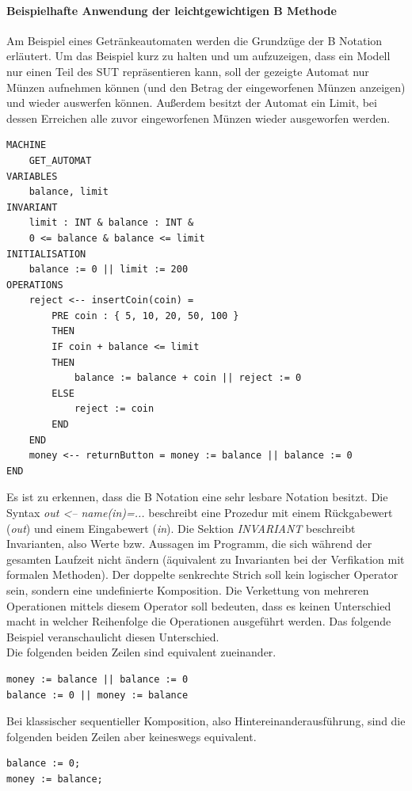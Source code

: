 \paragraph{Beispielhafte Anwendung der leichtgewichtigen B Methode}
Am Beispiel eines Getränkeautomaten werden die Grundzüge der B Notation erläutert. Um das Beispiel kurz zu halten und um aufzuzeigen, dass ein Modell nur einen Teil des \Gls{SUT} repräsentieren kann, soll der gezeigte Automat nur Münzen aufnehmen können (und den Betrag der eingeworfenen Münzen anzeigen) und wieder auswerfen können. Außerdem besitzt der Automat ein Limit, bei dessen Erreichen alle zuvor eingeworfenen Münzen wieder ausgeworfen werden.

\begin{lstlisting}[caption={Modell eines Getränkeautomaten in B-Notation},label=lst:b-notation]
MACHINE
	GET_AUTOMAT
VARIABLES
	balance, limit
INVARIANT
	limit : INT & balance : INT &
	0 <= balance & balance <= limit
INITIALISATION
	balance := 0 || limit := 200
OPERATIONS
	reject <-- insertCoin(coin) =
		PRE coin : { 5, 10, 20, 50, 100 }
		THEN
		IF coin + balance <= limit
		THEN
			balance := balance + coin || reject := 0
		ELSE
			reject := coin
		END
	END
	money <-- returnButton = money := balance || balance := 0
END
\end{lstlisting}

Es ist zu erkennen, dass die B Notation eine sehr lesbare Notation besitzt. Die Syntax \textit{out <-- name(in)=...} beschreibt eine Prozedur mit einem Rückgabewert (\textit{out}) und einem Eingabewert (\textit{in}). Die Sektion \textit{INVARIANT} beschreibt Invarianten, also Werte bzw. Aussagen im Programm, die sich während der gesamten Laufzeit nicht ändern (äquivalent zu Invarianten bei der Verfikation mit formalen Methoden). Der doppelte senkrechte Strich soll kein logischer Operator sein, sondern eine undefinierte Komposition. Die Verkettung von mehreren Operationen mittels diesem Operator soll bedeuten, dass es keinen Unterschied macht in welcher Reihenfolge die Operationen ausgeführt werden. Das folgende Beispiel veranschaulicht diesen Unterschied.\\

Die folgenden beiden Zeilen sind equivalent zueinander.
\begin{verbatim}
money := balance || balance := 0
balance := 0 || money := balance
\end{verbatim}

Bei klassischer sequentieller Komposition, also Hintereinanderausführung, sind die folgenden beiden Zeilen aber keineswegs equivalent.
\begin{verbatim}
balance := 0;
money := balance;
\end{verbatim}

